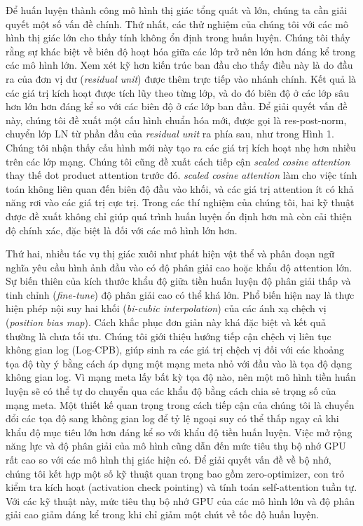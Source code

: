 \documentclass[times, twocolumn]{zHenriquesLab-StyleBioRxiv}
\begin{document}
Để huấn luyện thành công mô hình thị giác tổng quát và lớn, chúng ta cần giải quyết một số vấn đề chính. Thứ nhất, các thử nghiệm của chúng tôi với các mô hình thị giác lớn cho thấy tính không ổn định trong huấn luyện. Chúng tôi thấy rằng sự khác biệt về biên độ hoạt hóa giữa các lớp trở nên lớn hơn đáng kể trong các mô hình lớn. Xem xét kỹ hơn kiến trúc ban đầu cho thấy điều này là do đầu ra của đơn vị dư (\textit{residual unit}) được thêm trực tiếp vào nhánh chính. Kết quả là các giá trị kích hoạt được tích lũy theo từng lớp, và do đó biên độ ở các lớp sâu hơn lớn hơn đáng kể so với các biên độ ở các lớp ban đầu. Để giải quyết vấn đề này, chúng tôi đề xuất một cấu hình chuẩn hóa mới, được gọi là res-post-norm, chuyển lớp LN từ phần đầu của \textit{residual unit} ra phía sau, như trong Hình 1. Chúng tôi nhận thấy cấu hình mới này tạo ra các giá trị kích hoạt nhẹ hơn nhiều trên các lớp mạng. Chúng tôi cũng đề xuất cách tiếp cận \textit{scaled cosine attention} thay thế dot product attention trước đó. \textit{scaled cosine attention} làm cho việc tính toán không liên quan đến biên độ đầu vào khối, và các giá trị attention ít có khả năng rơi vào các giá trị cực trị. Trong các thí nghiệm của chúng tôi, hai kỹ thuật được đề xuất không chỉ giúp quá trình huấn luyện ổn định hơn mà còn cải thiện độ chính xác, đặc biệt là đối với các mô hình lớn hơn.

Thứ hai, nhiều tác vụ thị giác xuôi như phát hiện vật thể và phân đoạn ngữ nghĩa yêu cầu hình ảnh đầu vào có độ phân giải cao hoặc khẩu độ attention lớn. Sự biến thiên của kích thước khẩu độ giữa tiền huấn luyện độ phân giải thấp và tinh chỉnh (\textit{fine-tune}) độ phân giải cao có thể khá lớn. Phổ biến hiện nay là thực hiện phép nội suy hai khối (\textit{bi-cubic interpolation}) của các ánh xạ chệch vị (\textit{position bias map}). Cách khắc phục đơn giản này khá đặc biệt và kết quả thường là chưa tối ưu. Chúng tôi giới thiệu hướng tiếp cận chệch vị liên tục không gian log (Log-CPB), giúp sinh ra các giá trị chệch vị đối với các khoảng tọa độ tùy ý bằng cách áp dụng một mạng meta nhỏ với đầu vào là tọa độ dạng không gian log. Vì mạng meta lấy bất kỳ tọa độ nào, nên một mô hình tiền huấn luyện sẽ có thể tự do chuyển qua các khẩu độ bằng cách chia sẻ trọng số của mạng meta. Một thiết kế quan trọng trong cách tiếp cận của chúng tôi là chuyển đổi các tọa độ sang không gian log để tỷ lệ ngoại suy có thể thấp ngay cả khi khẩu độ mục tiêu lớn hơn đáng kể so với khẩu độ tiền huấn luyện. Việc mở rộng năng lực và độ phân giải của mô hình cũng dẫn đến mức tiêu thụ bộ nhớ GPU rất cao so với các mô hình thị giác hiện có. Để giải quyết vấn đề về bộ nhớ, chúng tôi kết hợp một số kỹ thuật quan trọng bao gồm zero-optimizer, con trỏ kiểm tra kích hoạt (activation check pointing) và tính toán self-attention tuần tự. Với các kỹ thuật này, mức tiêu thụ bộ nhớ GPU của các mô hình lớn và độ phân giải cao giảm đáng kể trong khi chỉ giảm một chút về tốc độ huấn luyện.
\end{document}
